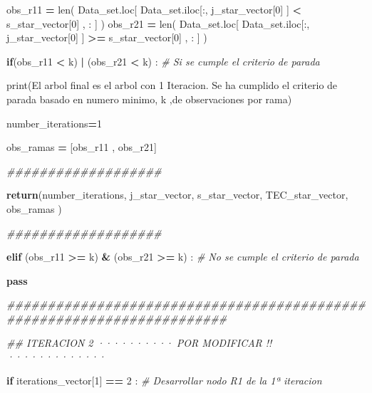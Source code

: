 \documentclass[
  11pt,
  a4paper,
]{article}
\newenvironment{Shaded}{\begin{snugshade}}{\end{snugshade}}
\newcommand{\BuiltInTok}[1]{#1}
\newcommand{\CommentTok}[1]{\textcolor[rgb]{0.56,0.35,0.01}{\textit{#1}}}
\newcommand{\ControlFlowTok}[1]{\textcolor[rgb]{0.13,0.29,0.53}{\textbf{#1}}}
\newcommand{\DecValTok}[1]{\textcolor[rgb]{0.00,0.00,0.81}{#1}}
\newcommand{\NormalTok}[1]{#1}
\newcommand{\OperatorTok}[1]{\textcolor[rgb]{0.81,0.36,0.00}{\textbf{#1}}}
\newcommand{\StringTok}[1]{\textcolor[rgb]{0.31,0.60,0.02}{#1}}
\begin{document}
\begin{Shaded}
\begin{Highlighting}[]
\NormalTok{        obs\_r11 }\OperatorTok{=} \BuiltInTok{len}\NormalTok{( Data\_set.loc[ Data\_set.iloc[:, j\_star\_vector[}\DecValTok{0}\NormalTok{] ] }\OperatorTok{\textless{}}\NormalTok{ s\_star\_vector[}\DecValTok{0}\NormalTok{] , : ] )}
\NormalTok{        obs\_r21 }\OperatorTok{=} \BuiltInTok{len}\NormalTok{( Data\_set.loc[ Data\_set.iloc[:, j\_star\_vector[}\DecValTok{0}\NormalTok{] ] }\OperatorTok{\textgreater{}=}\NormalTok{ s\_star\_vector[}\DecValTok{0}\NormalTok{] , : ] )}

        \ControlFlowTok{if}\NormalTok{(obs\_r11 }\OperatorTok{\textless{}}\NormalTok{ k) }\OperatorTok{|}\NormalTok{ (obs\_r21 }\OperatorTok{\textless{}}\NormalTok{ k) : }\CommentTok{\# Si se cumple el criterio de parada}


            \BuiltInTok{print}\NormalTok{(}\StringTok{\textquotesingle{}El arbol final es el arbol con 1 Iteracion. Se ha cumplido el criterio de parada basado en numero minimo\textquotesingle{}}\NormalTok{, k ,}\StringTok{\textquotesingle{}de observaciones por rama\textquotesingle{}}\NormalTok{)}

\NormalTok{            number\_iterations}\OperatorTok{=}\DecValTok{1}

\NormalTok{            obs\_ramas }\OperatorTok{=}\NormalTok{ [obs\_r11 , obs\_r21]}

       
            \CommentTok{\#\#\#\#\#\#\#\#\#\#\#\#\#\#\#\#\#\#\#}
            
            \ControlFlowTok{return}\NormalTok{(number\_iterations, j\_star\_vector, s\_star\_vector, TEC\_star\_vector, obs\_ramas ) }

            \CommentTok{\#\#\#\#\#\#\#\#\#\#\#\#\#\#\#\#\#\#\#}

        \ControlFlowTok{elif}\NormalTok{ (obs\_r11 }\OperatorTok{\textgreater{}=}\NormalTok{ k) }\OperatorTok{\&}\NormalTok{ (obs\_r21 }\OperatorTok{\textgreater{}=}\NormalTok{ k) : }\CommentTok{\# No se cumple el criterio de parada}

            \ControlFlowTok{pass}


\CommentTok{\#\#\#\#\#\#\#\#\#\#\#\#\#\#\#\#\#\#\#\#\#\#\#\#\#\#\#\#\#\#\#\#\#\#\#\#\#\#\#\#\#\#\#\#\#\#\#\#\#\#\#\#\#\#\#\#\#\#\#\#\#\#\#\#\#\#\#\#\#\#\#}

    \CommentTok{\#\# ITERACION 2   ·········· POR MODIFICAR !! ·············}

    \ControlFlowTok{if}\NormalTok{ iterations\_vector[}\DecValTok{1}\NormalTok{] }\OperatorTok{==} \DecValTok{2}\NormalTok{ :  }\CommentTok{\# Desarrollar nodo R1 de la 1ª iteracion}


\end{Highlighting}
\end{Shaded}
\end{document}
